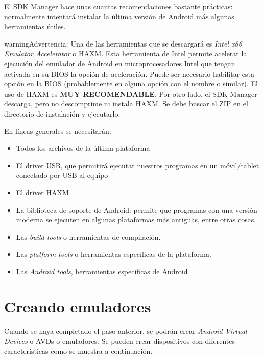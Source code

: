 \documentclass[a4paper,12pt,spanish]{sphinxmanual}
\begin{document}
El SDK Manager hace unas cuantas recomendaciones bastante prácticas: normalmente intentará instalar la última versión de Android más algunas herramientas útiles.

\begin{notice}{warning}{Advertencia:}
Una de las herramientas que se descargará es \emph{Intel x86 Emulator Accelerator} o HAXM. \href{http://software.intel.com/en-us/android/articles/intel-hardware-accelerated-execution-manager}{Esta herramienta de Intel} permite acelerar la ejecución del emulador de Android en microprocesadores Intel que tengan activada en su BIOS la opción de aceleración. Puede ser necesario habilitar esta opción en la BIOS (probablemente en alguna opción con el nombre  o similar). El uso de HAXM es \textbf{MUY RECOMENDABLE}. Por otro lado, el SDK Manager descarga, pero no descomprime ni instala HAXM. Se debe buscar el ZIP en el directorio de instalación y ejecutarlo.
\end{notice}

En líneas generales se necesitarán:
\begin{itemize}
\item {} 
Todos los archivos de la última plataforma

\item {} 
El driver USB, que permitirá ejecutar nuestros programas en un móvil/tablet conectado por USB al equipo

\item {} 
El driver HAXM

\item {} 
La biblioteca de soporte de Android: permite que programas con una versión moderna se ejecuten en algunas plataformas más antiguas, entre otras cosas.

\item {} 
Las \emph{build-tools} o herramientas de compilación.

\item {} 
Las \emph{platform-tools} o herramientas específicas de la plataforma.

\item {} 
Las \emph{Android tools}, herramientas específicas de Android

\end{itemize}


\section{Creando emuladores}
\label{tema1:creando-emuladores}
Cuando se haya completado el paso anterior, se podrán crear \emph{Android Virtual Devices} o AVDs o emuladores. Se pueden crear dispositivos con diferentes características como se muestra a continuación.
\end{document}
